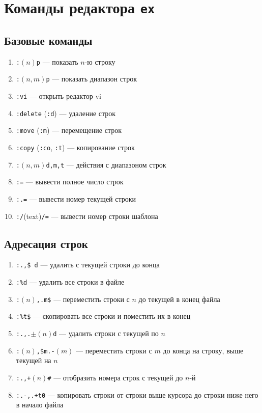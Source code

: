 \documentclass[a4paper,10pt, twocolumn]{article}
\newcommand*{\cod}[1]{\texttt{#1}}
\begin{document}
\newpage
\section{Команды редактора \cod{ex}}
 
\subsection{Базовые команды}
\begin{enumerate}
    \item \cod{:}$(n)$\cod{p} --- показать $n$-ю строку
    \item \cod{:}$(n,m)$\cod{p} --- показать диапазон строк
    \item \cod{:vi} --- открыть редактор vi
    \item \cod{:delete} (\cod{:d}) --- удаление строк
    \item \cod{:move} (\cod{:m}) --- перемещение строк
    \item \cod{:copy} (\cod{:co}, \cod{:t}) --- копирование строк
    \item \cod{:}$(n,m)$\cod{d,m,t} --- действия с диапазоном строк
    \item \cod{:=} --- вывести полное число строк
    \item \cod{:.=} --- вывести номер текущей строки
    \item \cod{:/}(text)\cod{/=} --- вывести номер строки шаблона
\end{enumerate}

\subsection{Адресация строк}
\begin{enumerate}
    \item \cod{:.,\$ d} --- удалить с текущей строки до конца
    \item \cod{:\%d} --- удалить все строки в файле
    \item \cod{:}$(n)$\cod{,.m\$} --- переместить строки с $n$ до текущей в конец файла
    \item \cod{:\%t\$} --- скопировать все строки и поместить их в конец
    \item \cod{:.,.}$\pm(n)$\cod{d} --- удалить строки с текущей по $n$
    \item \cod{:}$(n)$\cod{,\$m.-}$(m)$ --- переместить строки с $m$ до конца на строку, выше текущей на $n$
    \item \cod{:.,+}$(n)$\cod{\#} --- отобразить номера строк с текущей до $n$-й
    \item \cod{:.-,.+t0} --- копировать строки от строки выше курсора до строки ниже него в начало файла
\end{enumerate}
\end{document}
